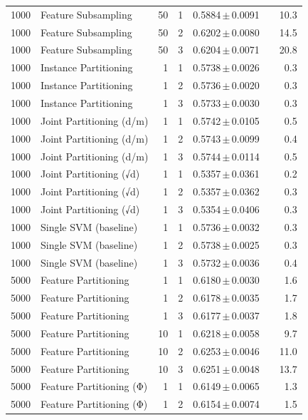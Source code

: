 \begin{table}[ht]
\begin{tabular}{rlrrccr}
1000 & Feature Subsampling & 50 & 1 & 0.5884\,$\pm$\,0.0091 &  & 10.3 \\
1000 & Feature Subsampling & 50 & 2 & 0.6202\,$\pm$\,0.0080 &  & 14.5 \\
1000 & Feature Subsampling & 50 & 3 & 0.6204\,$\pm$\,0.0071 &  & 20.8 \\
1000 & Instance Partitioning & 1 & 1 & 0.5738\,$\pm$\,0.0026 &  & 0.3 \\
1000 & Instance Partitioning & 1 & 2 & 0.5736\,$\pm$\,0.0020 &  & 0.3 \\
1000 & Instance Partitioning & 1 & 3 & 0.5733\,$\pm$\,0.0030 &  & 0.3 \\
1000 & Joint Partitioning (d/m) & 1 & 1 & 0.5742\,$\pm$\,0.0105 &  & 0.5 \\
1000 & Joint Partitioning (d/m) & 1 & 2 & 0.5743\,$\pm$\,0.0099 &  & 0.4 \\
1000 & Joint Partitioning (d/m) & 1 & 3 & 0.5744\,$\pm$\,0.0114 &  & 0.5 \\
1000 & Joint Partitioning (√d) & 1 & 1 & 0.5357\,$\pm$\,0.0361 &  & 0.2 \\
1000 & Joint Partitioning (√d) & 1 & 2 & 0.5357\,$\pm$\,0.0362 &  & 0.3 \\
1000 & Joint Partitioning (√d) & 1 & 3 & 0.5354\,$\pm$\,0.0406 &  & 0.3 \\
1000 & Single SVM (baseline) & 1 & 1 & 0.5736\,$\pm$\,0.0032 &  & 0.3 \\
1000 & Single SVM (baseline) & 1 & 2 & 0.5738\,$\pm$\,0.0025 &  & 0.3 \\
1000 & Single SVM (baseline) & 1 & 3 & 0.5732\,$\pm$\,0.0036 &  & 0.4 \\
5000 & Feature Partitioning & 1 & 1 & 0.6180\,$\pm$\,0.0030 &  & 1.6 \\
5000 & Feature Partitioning & 1 & 2 & 0.6178\,$\pm$\,0.0035 &  & 1.7 \\
5000 & Feature Partitioning & 1 & 3 & 0.6177\,$\pm$\,0.0037 &  & 1.8 \\
5000 & Feature Partitioning & 10 & 1 & 0.6218\,$\pm$\,0.0058 &  & 9.7 \\
5000 & Feature Partitioning & 10 & 2 & 0.6253\,$\pm$\,0.0046 &  & 11.0 \\
5000 & Feature Partitioning & 10 & 3 & 0.6251\,$\pm$\,0.0048 &  & 13.7 \\
5000 & Feature Partitioning (Φ) & 1 & 1 & 0.6149\,$\pm$\,0.0065 &  & 1.3 \\
5000 & Feature Partitioning (Φ) & 1 & 2 & 0.6154\,$\pm$\,0.0074 &  & 1.5 \\

\end{tabular}
\end{table}
